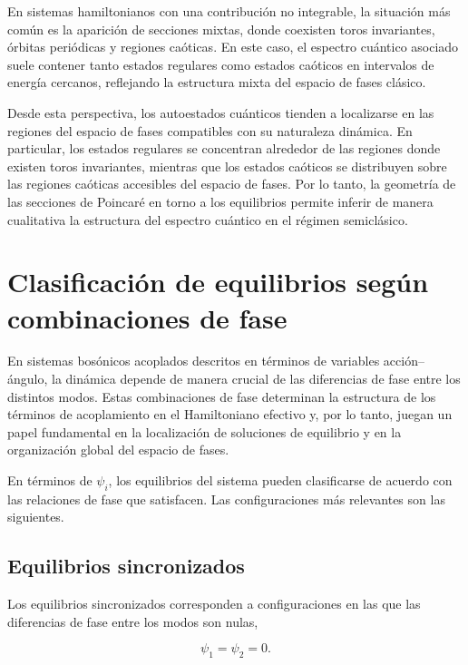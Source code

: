En sistemas hamiltonianos con una contribución no integrable, la situación más común es la aparición de secciones mixtas, donde coexisten toros invariantes, órbitas periódicas y regiones caóticas. En este caso, el espectro cuántico asociado suele contener tanto estados regulares como estados caóticos en intervalos de energía cercanos, reflejando la estructura mixta del espacio de fases clásico. \cite{mossmann2006semiclassical,habib1998decoherence}

Desde esta perspectiva, los autoestados cuánticos tienden a localizarse en las regiones del espacio de fases compatibles con su naturaleza dinámica. En particular, los estados regulares se concentran alrededor de las regiones donde existen toros invariantes, mientras que los estados caóticos se distribuyen sobre las regiones caóticas accesibles del espacio de fases. Por lo tanto, la geometría de las secciones de Poincaré en torno a los equilibrios permite inferir de manera cualitativa la estructura del espectro cuántico en el régimen semiclásico.

\section{Clasificación de equilibrios según combinaciones de fase}

En sistemas bosónicos acoplados descritos en términos de variables acción--ángulo, la dinámica depende de manera crucial de las diferencias de fase entre los distintos modos. Estas combinaciones de fase determinan la estructura de los términos de acoplamiento en el Hamiltoniano efectivo y, por lo tanto, juegan un papel fundamental en la localización de soluciones de equilibrio y en la organización global del espacio de fases.

En términos de $\psi_i$, los equilibrios del sistema pueden clasificarse de acuerdo con las relaciones de fase que satisfacen. Las configuraciones más relevantes son las siguientes.

\subsection{Equilibrios sincronizados}

Los equilibrios sincronizados corresponden a configuraciones en las que las diferencias de fase entre los modos son nulas,

\begin{equation}
    \psi_1 = \psi_2 = 0.
\end{equation}


